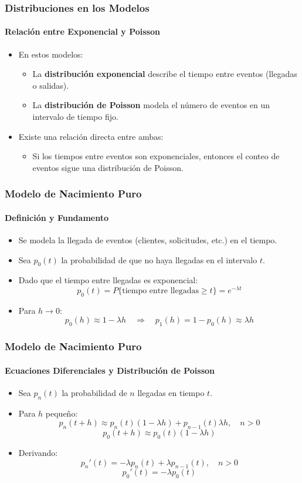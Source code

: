 \documentclass{beamer}
\begin{document}
\begin{frame}
\frametitle{Distribuciones en los Modelos}
\framesubtitle{Relación entre Exponencial y Poisson}

\begin{itemize}
    \item En estos modelos:
    \begin{itemize}
        \item La \textbf{distribución exponencial} describe el tiempo entre eventos (llegadas o salidas).
        \item La \textbf{distribución de Poisson} modela el número de eventos en un intervalo de tiempo fijo.
    \end{itemize}
    
    \item Existe una relación directa entre ambas: 
    \begin{itemize}
        \item Si los tiempos entre eventos son exponenciales, entonces el conteo de eventos sigue una distribución de Poisson.
    \end{itemize}
\end{itemize}
\end{frame}

\begin{frame}
\frametitle{Modelo de Nacimiento Puro}
\framesubtitle{Definición y Fundamento}

\begin{itemize}
    \item Se modela la llegada de eventos (clientes, solicitudes, etc.) en el tiempo.
    \item Sea $p_0(t)$ la probabilidad de que no haya llegadas en el intervalo $t$.
    \item Dado que el tiempo entre llegadas es exponencial:
    \[
    p_0(t) = P\{\text{tiempo entre llegadas} \geq t\} = e^{-\lambda t}
    \]
    \item Para $h \to 0$:
    \[
    p_0(h) \approx 1 - \lambda h
    \quad \Rightarrow \quad
    p_1(h) = 1 - p_0(h) \approx \lambda h
    \]
\end{itemize}
\end{frame}

\begin{frame}
\frametitle{Modelo de Nacimiento Puro}
\framesubtitle{Ecuaciones Diferenciales y Distribución de Poisson}

\begin{itemize}
    \item Sea $p_n(t)$ la probabilidad de $n$ llegadas en tiempo $t$.
    \item Para $h$ pequeño:
    \[
    p_n(t + h) \approx p_n(t)(1 - \lambda h) + p_{n-1}(t)\lambda h, \quad n > 0
    \]
    \[
    p_0(t + h) \approx p_0(t)(1 - \lambda h)
    \]
    \item Derivando:
    \[
    p_n'(t) = -\lambda p_n(t) + \lambda p_{n-1}(t), \quad n > 0
    \]
    \[
    p_0'(t) = -\lambda p_0(t)
    \]
\end{itemize}
\end{frame}
\end{document}
